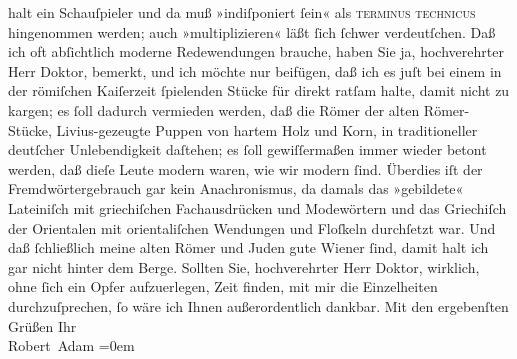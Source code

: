 \begin{ledgroupsized}[t]{13cm}
               halt ein Schauſpieler und da muß »indiſponiert ſein« als \textsc{terminus technicus} hingenommen werden; auch »multiplizieren« läßt ſich
               ſchwer verdeutſchen. Daß ich oft abſichtlich moderne Redewendungen brauche, haben Sie
               ja, hochverehrter Herr Doktor, be{\pb}merkt,
               und ich möchte nur beifügen, daß ich es juſt bei einem in der römiſchen Kaiſerzeit ſpielenden Stücke für direkt ratſam halte,
               damit nicht zu kargen; es ſoll dadurch vermieden werden, daß die Römer der alten Römer-Stücke, Livius-gezeugte Puppen von
               hartem Holz und Korn, in traditioneller deutſcher Unlebendigkeit daſtehen; es ſoll
               gewiſſermaßen immer wieder betont werden, daß dieſe Leute modern waren, wie wir
               modern ſind. Überdies iſt der Fremdwörtergebrauch gar kein Anachronismus, da damals
               das »gebildete« Lateiniſch mit griechiſchen
               Fachausdrücken und Modewörtern und das Griechiſch der Orientalen mit orientaliſchen Wendungen und Floſkeln
               durchſetzt war. Und daß ſchließlich meine alten Römer und Juden gute Wiener ſind, damit
               halt ich gar nicht hinter dem Berge.\pend
           \pstart
           Sollten Sie, hochverehrter Herr Doktor, wirklich, ohne ſich ein Opfer aufzuerlegen,
               Zeit finden, mit mir die Einzelheiten durchzuſprechen, ſo wäre ich Ihnen
               außerordentlich dankbar.\pend
           \pstart
           Mit den ergebenſten Grüßen\pend
           \pstart
           Ihr{\\[\baselineskip]}\spacefill\mbox{Robert Adam}\pend
           \leftskip=0em{}
         
         \endnumbering{}\end{ledgroupsized}  \newcommand{\dateiname}{L02279}\newcommand{\titel}{Robert Adam an Arthur Schnitzler, 5. 11. 1917}\newcommand{\editorInnen}{Martin Anton Müller und Gerd-Hermann Susen}
      